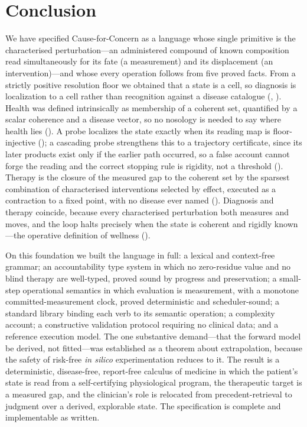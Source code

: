 \section{Conclusion}
\label{cfc:sec:conclusion}

We have specified Cause-for-Concern as a language whose single primitive is the
characterised perturbation---an administered compound of known composition read
simultaneously for its fate (a measurement) and its displacement (an
intervention)---and whose every operation follows from five proved facts. From a
strictly positive resolution floor we obtained that a state is a cell, so
diagnosis is localization to a cell rather than recognition against a disease
catalogue (, ). Health was defined intrinsically
as membership of a coherent set, quantified by a scalar coherence and a disease
vector, so no nosology is needed to say where health lies
(). A probe localizes the state exactly when its reading map
is floor-injective (); a cascading probe strengthens this
to a trajectory certificate, since its later products exist only if the earlier
path occurred, so a false account cannot forge the reading and the correct
stopping rule is rigidity, not a threshold ().
Therapy is the closure of the measured gap to the coherent set by the sparsest
combination of characterised interventions selected by effect, executed as a
contraction to a fixed point, with no disease ever named
(). Diagnosis and therapy coincide, because
every characterised perturbation both measures and moves, and the loop halts
precisely when the state is coherent and rigidly known---the operative
definition of wellness ().

On this foundation we built the language in full: a lexical and context-free
grammar; an accountability type system in which no zero-residue value and no
blind therapy are well-typed, proved sound by progress and preservation; a
small-step operational semantics in which evaluation is measurement, with a
monotone committed-measurement clock, proved deterministic and scheduler-sound;
a standard library binding each verb to its semantic operation; a complexity
account; a constructive validation protocol requiring no clinical data; and a
reference execution model. The one substantive demand---that the forward model
be derived, not fitted---was established as a theorem about extrapolation,
because the safety of risk-free \emph{in silico} experimentation reduces to it.
The result is a deterministic, disease-free, report-free calculus of medicine in
which the patient's state is read from a self-certifying physiological program,
the therapeutic target is a measured gap, and the clinician's role is relocated
from precedent-retrieval to judgment over a derived, explorable state. The
specification is complete and implementable as written.


